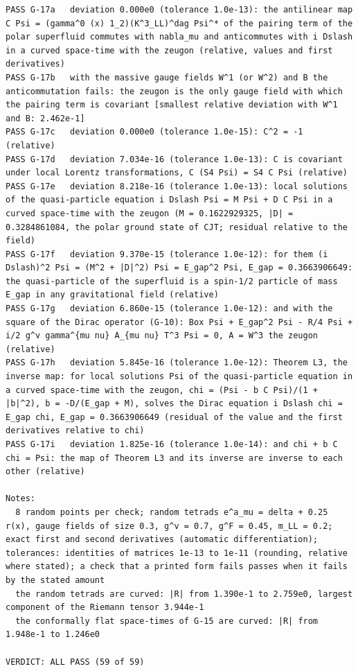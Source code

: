\documentclass[
  10pt,
]{article}
\begin{document}
\begin{verbatim}
PASS G-17a   deviation 0.000e0 (tolerance 1.0e-13): the antilinear map C Psi = (gamma^0 (x) 1_2)(K^3_LL)^dag Psi^* of the pairing term of the polar superfluid commutes with nabla_mu and anticommutes with i Dslash in a curved space-time with the zeugon (relative, values and first derivatives)
PASS G-17b   with the massive gauge fields W^1 (or W^2) and B the anticommutation fails: the zeugon is the only gauge field with which the pairing term is covariant [smallest relative deviation with W^1 and B: 2.462e-1]
PASS G-17c   deviation 0.000e0 (tolerance 1.0e-15): C^2 = -1 (relative)
PASS G-17d   deviation 7.034e-16 (tolerance 1.0e-13): C is covariant under local Lorentz transformations, C (S4 Psi) = S4 C Psi (relative)
PASS G-17e   deviation 8.218e-16 (tolerance 1.0e-13): local solutions of the quasi-particle equation i Dslash Psi = M Psi + D C Psi in a curved space-time with the zeugon (M = 0.1622929325, |D| = 0.3284861084, the polar ground state of CJT; residual relative to the field)
PASS G-17f   deviation 9.370e-15 (tolerance 1.0e-12): for them (i Dslash)^2 Psi = (M^2 + |D|^2) Psi = E_gap^2 Psi, E_gap = 0.3663906649: the quasi-particle of the superfluid is a spin-1/2 particle of mass E_gap in any gravitational field (relative)
PASS G-17g   deviation 6.860e-15 (tolerance 1.0e-12): and with the square of the Dirac operator (G-10): Box Psi + E_gap^2 Psi - R/4 Psi + i/2 g^v gamma^{mu nu} A_{mu nu} T^3 Psi = 0, A = W^3 the zeugon (relative)
PASS G-17h   deviation 5.845e-16 (tolerance 1.0e-12): Theorem L3, the inverse map: for local solutions Psi of the quasi-particle equation in a curved space-time with the zeugon, chi = (Psi - b C Psi)/(1 + |b|^2), b = -D/(E_gap + M), solves the Dirac equation i Dslash chi = E_gap chi, E_gap = 0.3663906649 (residual of the value and the first derivatives relative to chi)
PASS G-17i   deviation 1.825e-16 (tolerance 1.0e-14): and chi + b C chi = Psi: the map of Theorem L3 and its inverse are inverse to each other (relative)

Notes:
  8 random points per check; random tetrads e^a_mu = delta + 0.25 r(x), gauge fields of size 0.3, g^v = 0.7, g^F = 0.45, m_LL = 0.2; exact first and second derivatives (automatic differentiation); tolerances: identities of matrices 1e-13 to 1e-11 (rounding, relative where stated); a check that a printed form fails passes when it fails by the stated amount
  the random tetrads are curved: |R| from 1.390e-1 to 2.759e0, largest component of the Riemann tensor 3.944e-1
  the conformally flat space-times of G-15 are curved: |R| from 1.948e-1 to 1.246e0

VERDICT: ALL PASS (59 of 59)
\end{verbatim}
\end{document}
